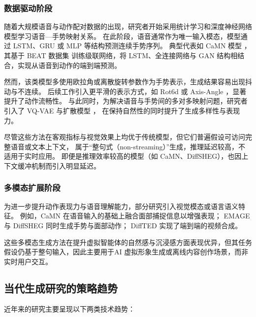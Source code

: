 \subsubsection{数据驱动阶段}

随着大规模语音与动作配对数据的出现，研究者开始采用统计学习和深度神经网络模型学习语音—手势映射关系。
在此阶段，语音通常作为唯一输入模态，模型通过 LSTM、GRU 或 MLP 等结构预测连续手势序列。
典型代表如 CaMN 模型 \cite{beatcamn}，其基于 BEAT 数据集 \cite{beatcamn} 训练级联网络，将 LSTM、全连接网络与 GAN 结构相结合，实现从语音到动作的端到端预测。

然而，该类模型多使用欧拉角或离散旋转参数作为手势表示，生成结果容易出现抖动与不连续。
后续工作引入更平滑的表示方式，如 Rot6d \cite{rot6d,emage,AMUSE2024} 或 Axis-Angle \cite{diffsheg}，显著提升了动作流畅性。
与此同时，为解决语音与手势间的多对多映射问题，研究者引入了 VQ-VAE \cite{emage,zhang2024SemanticGesticulator} 与扩散模型 \cite{tamingDiffgesture,diffsheg,diffstylegesture,DiffTED2024,diffusion-self-supervised2023}，
在保持自然性的同时提升了生成多样性与表现力。

尽管这些方法在客观指标与视觉效果上均优于传统模型，但它们普遍假设可访问完整语音或文本上下文，
属于“整句式（non-streaming）”生成，推理延迟较高，不适用于实时应用。
即便是推理效率较高的模型（如 CaMN、DiffSHEG），也因上下文缓冲机制而引入明显延迟。

\subsubsection{多模态扩展阶段}

为进一步提升动作表现力与语音理解能力，部分研究引入视觉模态或语言语义特征。
例如，CaMN \cite{beatcamn} 在语音输入的基础上融合面部捕捉信息以增强表现；
EMAGE \cite{emage} 与 DiffSHEG \cite{diffsheg} 同时生成手势与面部动作；
DiffTED \cite{DiffTED2024} 实现了端到端的视频合成。

这些多模态生成方法在提升虚拟智能体的自然感与沉浸感方面表现优异，但其任务假设仍基于整句输入，因此主要用于AI 虚拟形象生成或离线内容创作场景，而非实时用户交互。

\subsection{当代生成研究的策略趋势}
近年来的研究主要呈现以下两类技术趋势：

